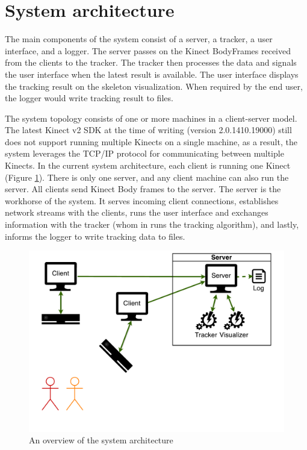 \section{System architecture}
\label{sec:design_architecture}

The main components of the system consist of a server, a tracker, a user interface, and a logger. The server passes on the Kinect BodyFrames received from the clients to the tracker. The tracker then processes the data and signals the user interface when the latest result is available. The user interface displays the tracking result on the skeleton visualization. When required by the end user, the logger would write tracking result to files.

The system topology consists of one or more machines in a client-server model. The latest Kinect v2 SDK at the time of writing (version 2.0.1410.19000) still does not support running multiple Kinects on a single machine, as a result, the system leverages the TCP/IP protocol for communicating between multiple Kinects. In the current system architecture, each client is running one Kinect (Figure \ref{fig:system_architecture}). There is only one server, and any client machine can also run the server. All clients send Kinect Body frames to the server. The server is the workhorse of the system. It serves incoming client connections, establishes network streams with the clients, runs the user interface and exchanges information with the tracker (whom in runs the tracking algorithm), and lastly, informs the logger to write tracking data to files.

\begin{figure}[!h]
  \centering
  \includegraphics[width=0.8\linewidth]{figs/system_architecture}
  \caption{An overview of the system architecture}
  \label{fig:system_architecture}
\end{figure}


